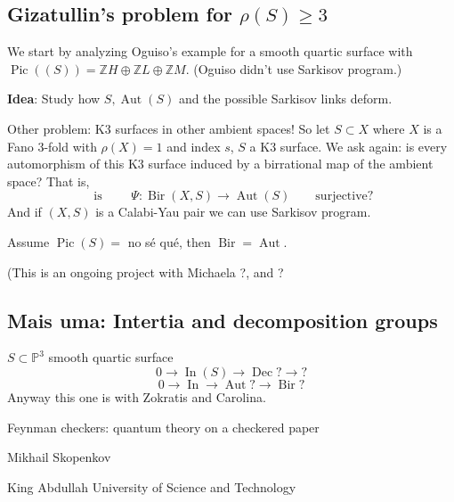 \subsection{Gizatullin's problem for \(\rho(S) \geq 3\)}

We start by analyzing Oguiso's example for a smooth quartic surface with \(\operatorname{Pic}((S))=\mathbb{Z}H \oplus  \mathbb{Z}L \oplus  \mathbb{Z}M\). (Oguiso didn't use Sarkisov program.)

\textbf{Idea}: Study how \(S, \operatorname{Aut}(S)\) and the possible Sarkisov links deform.

Other problem: K3 surfaces in other ambient spaces! So let \(S \subset X\) where \(X\) is a Fano 3-fold with \(\rho(X)=1\) and index \(s\), \(S\) a K3 surface. We ask again: is every automorphism of this K3 surface induced by a birrational map of the ambient space? That is,
\[\text{ is } \qquad \Psi:\operatorname{Bir}(X,S) \longrightarrow \operatorname{Aut}(S)\qquad \text{surjective?} \]
And if \((X,S)\) is a Calabi-Yau pair we can use Sarkisov program.

\begin{prop}\leavevmode
Assume \(\operatorname{Pic}(S) = \) no sé qué, then \(\operatorname{Bir}=\operatorname{Aut}\).
\end{prop}
(This is an ongoing project with Michaela ?, and ?

\subsection{Mais uma: Intertia and decomposition groups}
\(S \subset \mathbb{P}^3\) smooth quartic surface
\[0 \to \operatorname{ I n}(S) \to \operatorname{ D e c}? \to ?\]
\[0 \to \operatorname{ I n} \to \operatorname{Aut}? \to \operatorname{Bir}?\]
Anyway this one is with Zokratis and Carolina.

\clearpage{}
{\Huge Feynman checkers: quantum theory on a checkered paper}

\hfill{\Large Mikhail Skopenkov}

{\Large \hfill King Abdullah University of Science and Technology}

